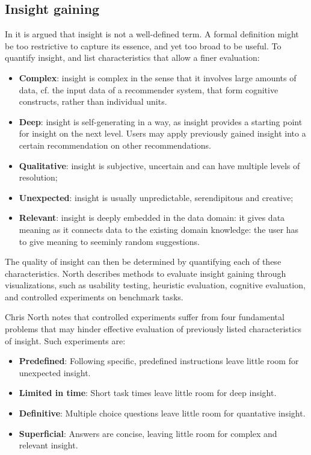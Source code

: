 \subsection{Insight gaining}\label{chapter:literature_study:section:user:subsection:insight}

In \cite{north:2006} it is argued that insight is not a well-defined term. A formal definition might be too restrictive to capture its essence, and yet too broad to be useful. To quantify insight, \cite{north:2006} and \cite{yi:2008} list characteristics that allow a finer evaluation:

\begin{itemize}
	\item \textbf{Complex}: insight is complex in the sense that it involves large amounts of data, cf. the input data of a recommender system, that form cognitive constructs, rather than individual units.
	\item \textbf{Deep}: insight is self-generating in a way, as insight provides a starting point for insight on the next level. Users may apply previously gained insight into a certain recommendation on other recommendations.
	\item \textbf{Qualitative}: insight is subjective, uncertain and can have multiple levels of resolution;
	\item \textbf{Unexpected}: insight is usually unpredictable, serendipitous and creative;
	\item \textbf{Relevant}: insight is deeply embedded in the data domain: it gives data meaning as it connects data to the existing domain knowledge: the user has to give meaning to seeminly random suggestions.
\end{itemize}

The quality of insight can then be determined by quantifying each of these characteristics\cite{north:2006}. North describes methods to evaluate insight gaining through visualizations, such as usability testing, heuristic evaluation, cognitive evaluation, and controlled experiments on benchmark tasks\cite{north:2006}.

Chris North notes that controlled experiments suffer from four fundamental problems that may hinder effective evaluation of previously listed characteristics of insight. Such experiments are\cite{north:2006}:

\begin{itemize}
	\item \textbf{Predefined}: Following specific, predefined instructions leave little room for unexpected insight.
	\item \textbf{Limited in time}: Short task times leave little room for deep insight.
	\item \textbf{Definitive}: Multiple choice questions leave little room for quantative insight.
	\item \textbf{Superficial}: Answers are concise, leaving little room for complex and relevant insight.
\end{itemize}

